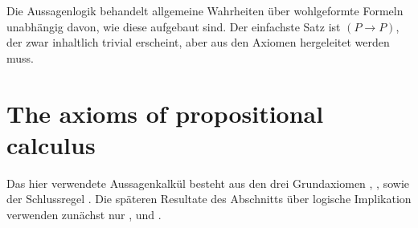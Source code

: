 \documentclass[main.tex]{subfiles}
\begin{document}


\begin{remark}
Die Aussagenlogik behandelt allgemeine Wahrheiten über wohlgeformte Formeln unabhängig
davon, wie diese aufgebaut sind. Der einfachste Satz ist \((P \rightarrow P)\), der zwar
inhaltlich trivial erscheint, aber aus den Axiomen hergeleitet werden muss.
\end{remark}

\section{The axioms of propositional calculus}

\begin{remark}
Das hier verwendete Aussagenkalkül besteht aus den drei Grundaxiomen
, , 
sowie der Schlussregel . Die späteren Resultate des
Abschnitts über logische Implikation verwenden zunächst nur
,  und .
\end{remark}

\begin{tabproof}
\end{tabproof}

\begin{tabproof}
\end{tabproof}

\begin{tabproof}
\end{tabproof}
\end{document}
